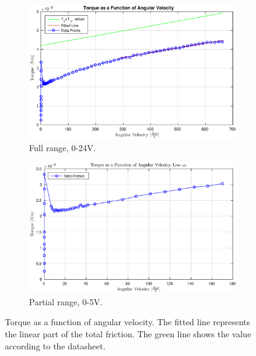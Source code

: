 \begin{figure}[!h]
	\begin{subfigure}[t]{.49\linewidth}
		\centering
		\includegraphics[width=\textwidth]{graphics/tevel}
		\caption{Full range, 0-24V.}
		\label{fig:tqanglefull}
	\end{subfigure}
	\begin{subfigure}[t]{.49\linewidth}
		\includegraphics[width=\textwidth]{graphics/tevel_low}
		\caption{Partial range, 0-5V.}
		\label{fig:tqanglelow}
	\end{subfigure}
	\caption[Torque as a function of angular velocity]{Torque as a function of angular velocity. The fitted line represents the linear part of the total friction. The green line shows the value according to the datasheet.}
	\label{fig:tqangle}
\end{figure}

